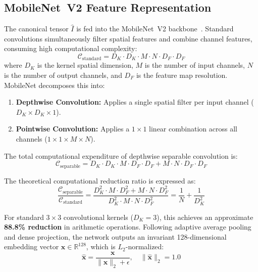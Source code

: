 \documentclass[conference]{IEEEtran}
\begin{document}
\subsection{MobileNet~V2 Feature Representation}
The canonical tensor $\hat{I}$ is fed into the MobileNet~V2 backbone~\cite{howard2017mobilenets}. Standard convolutions simultaneously filter spatial features and combine channel features, consuming high computational complexity:
\begin{equation}
\mathcal{C}_{\text{standard}} = D_K \cdot D_K \cdot M \cdot N \cdot D_F \cdot D_F
\end{equation}
where $D_K$ is the kernel spatial dimension, $M$ is the number of input channels, $N$ is the number of output channels, and $D_F$ is the feature map resolution. MobileNet decomposes this into:
\begin{enumerate}
    \item \textbf{Depthwise Convolution:} Applies a single spatial filter per input channel ($D_K \times D_K \times 1$).
    \item \textbf{Pointwise Convolution:} Applies a $1 \times 1$ linear combination across all channels ($1 \times 1 \times M \times N$).
\end{enumerate}

The total computational expenditure of depthwise separable convolution is:
\begin{equation}
\mathcal{C}_{\text{separable}} = D_K \cdot D_K \cdot M \cdot D_F \cdot D_F + M \cdot N \cdot D_F \cdot D_F
\end{equation}

The theoretical computational reduction ratio is expressed as:
\begin{equation}
\frac{\mathcal{C}_{\text{separable}}}{\mathcal{C}_{\text{standard}}} = \frac{D_K^2 \cdot M \cdot D_F^2 + M \cdot N \cdot D_F^2}{D_K^2 \cdot M \cdot N \cdot D_F^2} = \frac{1}{N} + \frac{1}{D_K^2}
\end{equation}

For standard $3 \times 3$ convolutional kernels ($D_K = 3$), this achieves an approximate \textbf{88.8\% reduction} in arithmetic operations. Following adaptive average pooling and dense projection, the network outputs an invariant 128-dimensional embedding vector $\mathbf{x} \in \mathbb{R}^{128}$, which is $L_2$-normalized:
\begin{equation}
\hat{\mathbf{x}} = \frac{\mathbf{x}}{\|\mathbf{x}\|_2 + \epsilon}, \quad \|\hat{\mathbf{x}}\|_2 = 1.0
\end{equation}
\end{document}
